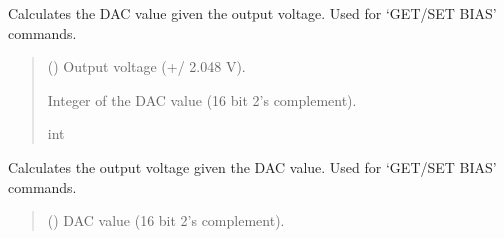 \documentclass[letterpaper,10pt,english]{sphinxmanual}
\begin{document}
\begin{fulllineitems}
\begin{fulllineitems}
\label{\detokenize{PodApi.Devices:PodApi.Devices.PodDevice_8401HR.Pod8401HR.CalculateBiasDAC_GetDACValue}}
\pysigstartsignatures
{}
\pysigstopsignatures
\sphinxAtStartPar
Calculates the DAC value given the output voltage. Used for ‘GET/SET BIAS’ commands.
\begin{quote}\begin{description}
\sphinxAtStartPar
{} (\sphinxstyleliteralemphasis{\sphinxupquote{ | }}) \textendash{} Output voltage (+/\sphinxhyphen{} 2.048 V).

\sphinxAtStartPar
Integer of the DAC value (16 bit 2’s complement).

\sphinxAtStartPar
int

\end{description}\end{quote}

\end{fulllineitems}


\begin{fulllineitems}
\label{\detokenize{PodApi.Devices:PodApi.Devices.PodDevice_8401HR.Pod8401HR.CalculateBiasDAC_GetVout}}
\pysigstartsignatures
{}
\pysigstopsignatures
\sphinxAtStartPar
Calculates the output voltage given the DAC value. Used for ‘GET/SET BIAS’ commands.
\begin{quote}\begin{description}
\sphinxAtStartPar
{} () \textendash{} DAC value (16 bit 2’s complement).


\end{description}
\end{quote}
\end{fulllineitems}
\end{fulllineitems}
\end{document}
